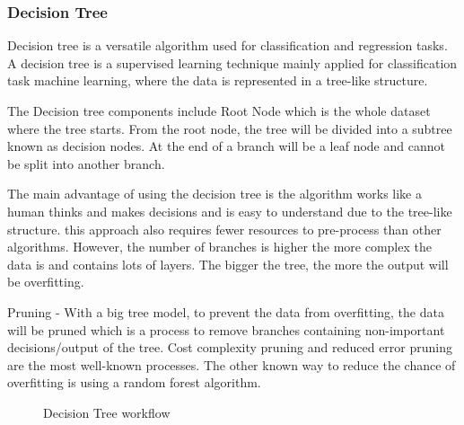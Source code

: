 \subsubsection{Decision Tree}
Decision tree is a versatile algorithm used for classification and regression tasks. A decision tree is a supervised learning technique mainly applied for classification task machine learning, where the data is represented in a tree-like structure. 

The Decision tree components include Root Node which is the whole dataset where the tree starts. From the root node, the tree will be divided into a subtree known as decision nodes. At the end of a branch will be a leaf node and cannot be split into another branch.

The main advantage of using the decision tree is the algorithm works like a human thinks and makes decisions and is easy to understand due to the tree-like structure. this approach also requires fewer resources to pre-process than other algorithms. However, the number of branches is higher the more complex the data is and contains lots of layers. The bigger the tree, the more the output will be overfitting.

Pruning - With a big tree model, to prevent the data from overfitting, the data will be pruned which is a process to remove branches containing non-important decisions/output of the tree. Cost complexity pruning and reduced error pruning are the most well-known processes. The other known way to reduce the chance of overfitting is using a random forest algorithm.


\begin{figure}[h]
\centering
\caption{Decision Tree workflow} \label{fig:result-checkpoint-micro}
\end{figure}


